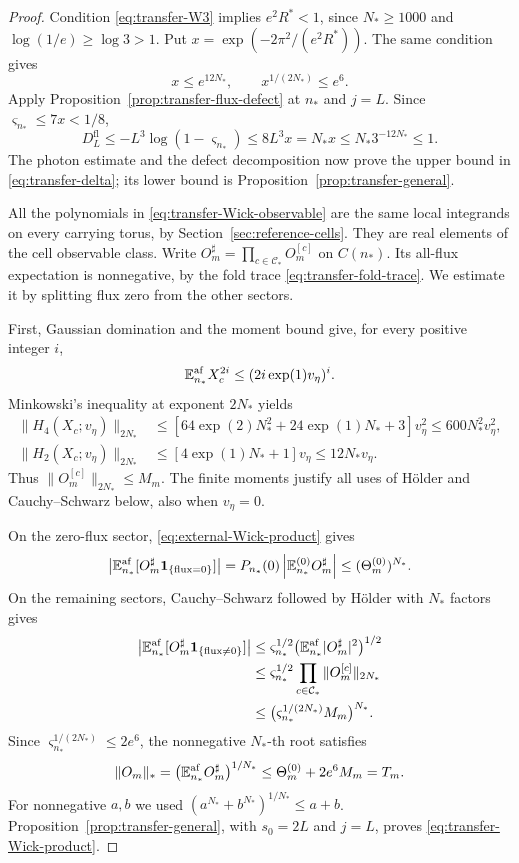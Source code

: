 \begin{proof}
Condition \eqref{eq:transfer-W3} implies $e^2R^*<1$,
since $N_*\ge1000$ and $\log(1/e)\ge\log3>1$.
Put $x=\exp(-2\pi^2/(e^2R^*))$. The same condition gives
\[
 x\le e^{12N_*},\qquad x^{1/(2N_*)}\le e^6.
\]
Apply Proposition~\ref{prop:transfer-flux-defect} at
$n_*$ and $j=L$. Since $\varsigma_{n_*}\le7x<1/8$,
\[
 D_L^{\mathrm{fl}}\le-L^3\log(1-\varsigma_{n_*})
              \le8L^3x=N_*x
              \le N_*3^{-12N_*}\le1.
\]
The photon estimate and the defect decomposition
now prove the upper bound in \eqref{eq:transfer-delta};
its lower bound is Proposition~\ref{prop:transfer-general}.

All the polynomials in \eqref{eq:transfer-Wick-observable}
are the same local integrands on every carrying torus,
by Section~\ref{sec:reference-cells}. They are real
elements of the cell observable class. Write
$O_m^\sharp=\prod_{c\in\mathcal C_*}O_m^{[c]}$ on
$C(n_*)$. Its all-flux expectation is nonnegative,
by the fold trace \eqref{eq:transfer-fold-trace}.
We estimate it by splitting flux zero from the
other sectors.

First, Gaussian domination and the moment bound
give, for every positive integer $i$,
\[
 \mathbb E_{n_*}^{\mathrm{af}}X_c^{2i}
                              \le(2i\exp(1)v_\eta)^i.
\]
Minkowski's inequality at exponent $2N_*$ yields
\begin{align*}
 \|H_4(X_c;v_\eta)\|_{2N_*}
   &\le[64\exp(2)N_*^2+24\exp(1)N_*+3]v_\eta^2
       \le600N_*^2v_\eta^2,\\
 \|H_2(X_c;v_\eta)\|_{2N_*}
   &\le[4\exp(1)N_*+1]v_\eta
       \le12N_*v_\eta.
\end{align*}
Thus $\|O_m^{[c]}\|_{2N_*}\le M_m$.
The finite moments justify all uses of H\"older
and Cauchy--Schwarz below, also when $v_\eta=0$.

On the zero-flux sector,
\eqref{eq:external-Wick-product} gives
\[
 \left|\mathbb E_{n_*}^{\mathrm{af}}
               [O_m^\sharp\mathbf1_{\{\mathrm{flux}=0\}}]\right|
   =P_{n_*}(0)\left|\mathbb E_{n_*}^{(0)}O_m^\sharp\right|
   \le(\Theta_m^{(0)})^{N_*}.
\]
On the remaining sectors, Cauchy--Schwarz followed
by H\"older with $N_*$ factors gives
\begin{align*}
 \left|\mathbb E_{n_*}^{\mathrm{af}}
               [O_m^\sharp\mathbf1_{\{\mathrm{flux}\ne0\}}]\right|
 &\le\varsigma_{n_*}^{1/2}
                \bigl(\mathbb E_{n_*}^{\mathrm{af}}|O_m^\sharp|^2\bigr)^{1/2}\\
 &\le\varsigma_{n_*}^{1/2}
                \prod_{c\in\mathcal C_*}\|O_m^{[c]}\|_{2N_*}\\
 &\le\bigl(\varsigma_{n_*}^{1/(2N_*)}M_m\bigr)^{N_*}.
\end{align*}
Since $\varsigma_{n_*}^{1/(2N_*)}\le2e^6$,
the nonnegative $N_*$-th root satisfies
\[
 \|O_m\|_*=
       \bigl(\mathbb E_{n_*}^{\mathrm{af}}O_m^\sharp\bigr)^{1/N_*}
             \le\Theta_m^{(0)}+2e^6M_m=T_m.
\]
For nonnegative $a,b$ we used
$(a^{N_*}+b^{N_*})^{1/N_*}\le a+b$.
Proposition~\ref{prop:transfer-general}, with
$s_0=2L$ and $j=L$, proves
\eqref{eq:transfer-Wick-product}.


\end{proof}
